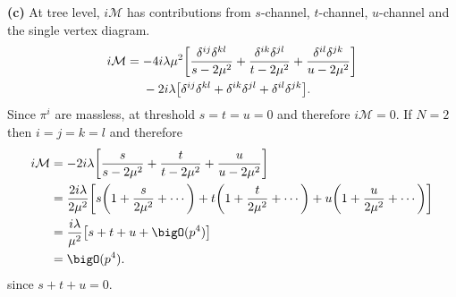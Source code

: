 \documentclass{article}
\makeatletter
\newcommand*{\shifttext}[1]{%
  \settowidth{\@tempdima}{#1}%
  \hspace{-\@tempdima}#1%
}
\newcommand{\plabel}[1]{%
\shifttext{\textbf{#1}\quad}%
}
\makeatother
\begin{document}
\plabel{(c)}%
At tree level, $i\mathcal{M}$ has contributions from $s$-channel, $t$-channel, $u$-channel and the single vertex diagram.
\begin{align*}
  i\mathcal{M} &= -4i\lambda \mu^2 \qty[\frac{\delta^{ij}\delta^{kl}}{s - 2\mu^2} + \frac{\delta^{ik}\delta^{jl}}{t - 2\mu^2} + \frac{\delta^{il}\delta^{jk}}{u - 2\mu^2}] \\
  &\phantom{{}={}} - 2i\lambda \qty[\delta^{ij} \delta^{kl} + \delta^{ik}\delta^{jl} + \delta^{il}\delta^{jk}].
\end{align*}
Since $\pi^i$ are massless, at threshold $s=t=u=0$ and therefore $i\mathcal{M} = 0$.
If $N=2$ then $i=j=k=l$ and therefore
\begin{align*}
  i\mathcal{M} &= -2i\lambda \qty[\frac{s}{s - 2\mu^2} + \frac{t}{t - 2\mu^2} + \frac{u}{u - 2\mu^2}] \\
  &= \frac{2i\lambda}{2\mu^2} \qty[s\qty(1+\frac{s}{2\mu^2}+ \cdots) + t\qty(1+\frac{t}{2\mu^2}+\cdots) + u\qty(1+\frac{u}{2\mu^2}+\cdots)] \\
  &= \frac{i\lambda}{\mu^2}\qty[s+t+u + \bigO(p^4)] \\
  &= \bigO(p^4).
\end{align*}
since $s+t+u=0$.
\end{document}
